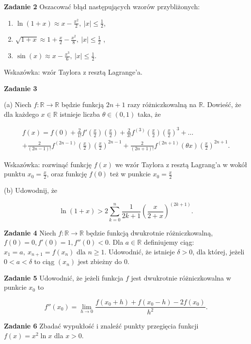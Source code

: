 \documentclass[a4paper,11pt]{article}
\begin{document}
\bigskip

\textbf{Zadanie 2} Oszacować błąd następujących wzorów przybliżonych:

\begin{enumerate}
  \item $\ln(1+x) \approx x - \frac{x^2}{2}, ~ |x| \le \frac{1}{2}$,
  \item $\sqrt{1+x} \approx 1 + \frac{x}{2} - \frac{x^2}{8}, ~|x| \le
    \frac{1}{2}$ ,
  \item $\sin(x) \approx x -  \frac{x^3}{6}, ~|x| \le \frac{1}{2}$.
\end{enumerate}

Wskazówka: wzór Taylora z resztą Lagrange’a.

\bigskip

\textbf{Zadanie 3} 

(a) Niech $f : \mathbb{R} \to \mathbb{R}$ będzie funkcją $2n + 1$ razy
różniczkowalną na $\mathbb{R}$.  Dowieść, że dla każdego $x \in
\mathbb{R}$ istnieje liczba $\theta \in (0, 1)$ taka, że

\begin{multline*}
  f(x) = f(0) + 
  \frac{2}{1!} f'\left(\frac{x}{2}\right) \left(\frac{x}{2}\right) +
  \frac{2}{3!}f^{(3)}\left(\frac{x}{2}\right) \left( \frac{x}{2} \right) ^3
  + \ldots  \\
  + \frac{2}{(2n-1)!}f^{(2n-1)}\left( \frac{x}{2} \right) \left(
  \frac{x}{2} \right)^{2n-1} +
  \frac{2}{(2n+1)!} f^{(2n+1)}(\theta x) \left( \frac{x}{2}
  \right)^{2n+1}.
\end{multline*}

Wskazówka: rozwinąć funkcję $f(x)$ we wzór Taylora z resztą Lagrang'a w
wokół punktu $x_0 = \frac{x}{2}$, oraz funkcję $f(0)$ też w punkcie $x_0
= \frac{x}{2}$

\medskip

(b) Udowodnij, że 

\[
\ln(1+x) > 2 \sum_{k=0}^n \frac{1}{2k+1} \left( \frac{x}{2+x}
\right)^{(2k+1)}
.\] 

\bigskip

\textbf{Zadanie 4} Niech $f: \mathbb{R} \to \mathbb{R}$ będzie funkcją
dwukrotnie różniczkowalną, ${f(0) = 0, f'(0) = 1, f''(0) < 0}$. Dla  $a
\in \mathbb{R}$ definiujemy ciąg: $x_1 = a,~x_{n+1} = f(x_n)$ dla $n\ge
1$. Udowodnić, że istnieje $\delta > 0$, dla której, jeżeli $0 < a <
\delta$ to ciąg $(x_n)$ jest zbieżny do 0.

\bigskip

\textbf{Zadanie 5} Udowodnić, że jeżeli funkcja $f$ jest dwukrotnie
różniczkowalna w punkcie $x_0$ to

\[
f''(x_0) = \lim_{h\to 0} \frac{f(x_0 + h) + f(x_0 - h) - 2f(x_0)}{h^2}
.\] 

\bigskip

\textbf{Zadanie 6} Zbadać wypukłość i znaleźć punkty przegięcia funkcji
$f(x) = x^2 \ln x$ dla $x > 0$.
\end{document}

